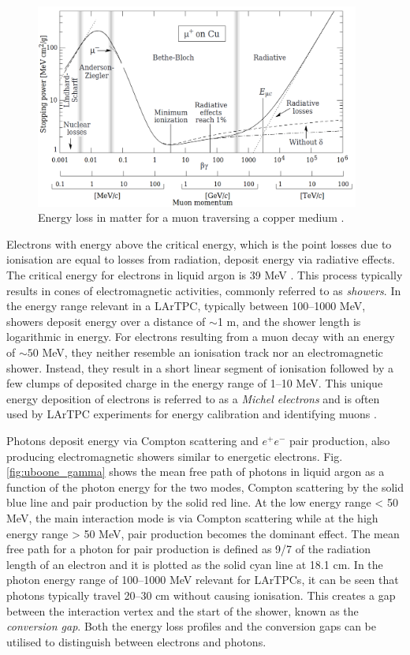 \begin{figure}[ht!] 
\centering    
\includegraphics[width=0.95\textwidth]{BetheBloch}
\caption[Muon Energy Loss in a Copper Medium]{
Energy loss in matter for a muon traversing a copper medium \cite{Passage}.
}
\label{fig:BetheBloch}
\end{figure}

Electrons with energy above the critical energy, which is the point losses due to ionisation are equal to losses from radiation, deposit energy via radiative effects.
The critical energy for electrons in liquid argon is 39 MeV \cite{uboone_gamma}.
This process typically results in cones of electromagnetic activities, commonly referred to as \textit{showers}.
In the energy range relevant in a LArTPC, typically between 100--1000 MeV, showers deposit energy over a distance of $\sim$1 m, and the shower length is logarithmic in energy.
For electrons resulting from a muon decay with an energy of $\sim50$ MeV, they neither resemble an ionisation track nor an electromagnetic shower.
Instead, they result in a short linear segment of ionisation followed by a few clumps of deposited charge in the energy range of 1--10 MeV.
This unique energy deposition of electrons is referred to as a \textit{Michel electrons} and is often used by LArTPC experiments for energy calibration and identifying muons  \cite{uboone_michel}.

Photons deposit energy via Compton scattering and $e^+e^-$ pair production, also producing electromagnetic showers similar to energetic electrons.
Fig. \ref{fig:uboone_gamma} shows the mean free path of photons in liquid argon as a function of the photon energy for the two modes, Compton scattering by the solid blue line and pair production by 
the solid red line.
At the low energy range < 50 MeV, the main interaction mode is via Compton scattering while at the high energy range > 50 MeV, pair production becomes the dominant effect.
The mean free path for a photon for pair production is defined as 9/7 of the radiation length of an electron and it is plotted as the solid cyan line at 18.1 cm.
In the photon energy range of 100--1000 MeV relevant for LArTPCs, it can be seen that photons typically travel 20--30 cm without causing ionisation.
This creates a gap between the interaction vertex and the start of the shower, known as the \textit{conversion gap}.
Both the energy loss profiles and the conversion gaps can be utilised to distinguish between electrons and photons. 

